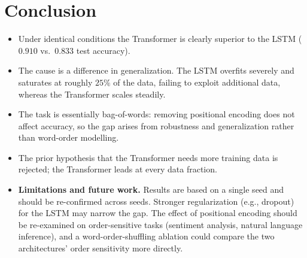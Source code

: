 \documentclass[10pt,twocolumn,letterpaper]{article}
\begin{document}
\section{Conclusion}
\begin{itemize}[leftmargin=1.2em,itemsep=2pt,topsep=2pt]
\item Under identical conditions the Transformer is clearly superior to the
LSTM ($0.910$ vs.\ $0.833$ test accuracy).
\item The cause is a difference in generalization. The LSTM overfits severely
and saturates at roughly $25\%$ of the data, failing to exploit additional
data, whereas the Transformer scales steadily.
\item The task is essentially bag-of-words: removing positional encoding does
not affect accuracy, so the gap arises from robustness and generalization
rather than word-order modelling.
\item The prior hypothesis that the Transformer needs more training data is
rejected; the Transformer leads at every data fraction.
\item \textbf{Limitations and future work.} Results are based on a single seed
and should be re-confirmed across seeds. Stronger regularization (e.g.,
dropout) for the LSTM may narrow the gap. The effect of positional encoding
should be re-examined on order-sensitive tasks (sentiment analysis, natural
language inference), and a word-order-shuffling ablation could compare the two
architectures' order sensitivity more directly.
\end{itemize}

{\small


}
\end{document}
